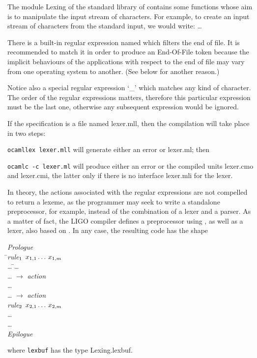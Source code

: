 \documentclass[12pt,a4paper]{article}
\begin{document}
The module \textsf{Lexing} of the standard library of \OCaml contains
some functions whose aim is to manipulate the input stream of
characters. For example, to create an input stream of characters from
the standard input, we would write: \Xlet {} \equal{}
  \Xin{} \ldots

There is a built\hyp{}in regular expression named  which
filters the end of file. It is recommended to match it in order to
produce an End\hyp{}Of\hyp{}File token \Teof because the implicit
behaviours of the applications with respect to the end of file may
vary from one operating system to another. (See below for another
reason.)

Notice also a special regular expression `\textsf{\large \_}' which
matches any kind of character. The order of the regular expressions
matters, therefore this particular expression must be the last one,
otherwise any subsequent expression would be ignored.

If the \ocamllex specification is a file named \textsf{lexer.mll},
then the compilation will take place in two steps:
\begin{enumerate*}

   \item \texttt{ocamllex lexer.mll} will generate either an error or
     \textsf{lexer.ml}; then

   \item \texttt{ocamlc -c lexer.ml} will produce either an error or
     the compiled units \textsf{lexer.cmo} and \textsf{lexer.cmi}, the
     latter only if there is no interface \textsf{lexer.mli} for the
     lexer.

\end{enumerate*}
In theory, the actions associated with the regular expressions are not
compelled to return a lexeme, as the programmer may seek to write a
standalone preprocessor, for example, instead of the combination of a
lexer and a parser. As a matter of fact, the LIGO compiler defines a
preprocessor using \ocamllex, as well as a lexer, also based on
\ocamllex. In any case, the resulting \OCaml code has the shape
\begin{tabbing}
\emph{Prologue}\\
\Xlet \= \Xrec \emph{rule}\(\sb{1}\) \(x\sb{1,1} \dots\, x\sb{1,m}\)  \equal\\
\> \ldots{} \= \Xmatch \ldots{} \Xwith\\
\>\> \; \ldots{} \(\rightarrow\) \emph{action}\\
\>\> \vbar{} \ldots{}\\
\>\> \vbar{} \ldots{} \(\rightarrow\) \emph{action}\\
\Xand \emph{rule}\(\sb{2}\) \(x\sb{2,1} \dots\, x\sb{2,m}\)
 \equal\\
\> \ldots\\
\Xand \ldots\\
\emph{Epilogue}
\end{tabbing}
where \texttt{lexbuf} has the type \textsf{Lexing.lexbuf}.
\end{document}
